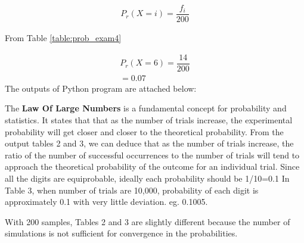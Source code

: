 \begin{align}
    P_r (X=i)= \dfrac{{f}_{i}}{200}
\end{align}

From Table \ref{table:prob_exam4}

\begin{align}
    P_r (X=6)= \dfrac{14}{200}\\
    =0.07
\end{align}
The outputs of Python program are attached below:


The \textbf{Law Of Large Numbers} is a fundamental concept for probability and statistics. It states that  that as the number of trials increase, the experimental probability will get closer and closer to the theoretical probability.
 From the output tables 2 and 3, we can deduce that as the number of trials increase,  the ratio of the number of successful occurrences to the number of trials will tend to approach the theoretical probability of the outcome for an individual trial. 
Since all the digits are equiprobable, ideally each probability should be 1/10=0.1
 In Table 3, when number of trials are 10,000, probability of each digit is approximately 0.1 with very little deviation. eg. 0.1005.  

With 200 samples, Tables 2 and 3 are slightly different because the number of simulations is not sufficient for convergence in the probabilities.
